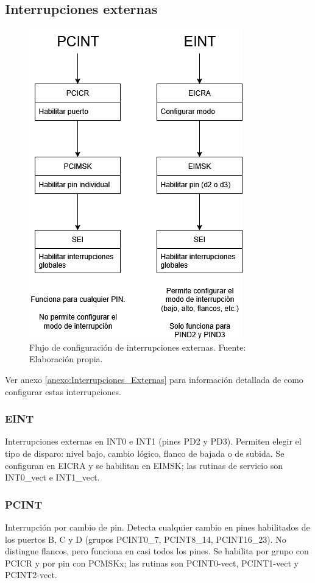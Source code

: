\subsection{Interrupciones externas}

    \begin{figure}[H]
    \centering
    \includegraphics[width=0.7\linewidth]{./Anexos/Marco Teorico/External Interrupts/Interrupt diagram.png}
    \caption{Flujo de configuración de interrupciones externas. Fuente: Elaboración propia.}
    \label{fig:InterruptDiagram}
    \end{figure}

    Ver anexo \ref{anexo:Interrupciones_Externas} para información detallada de como configurar estas interrupciones.

    \subsubsection{EINT}
    Interrupciones externas en INT0 e INT1 (pines PD2 y PD3). Permiten elegir el tipo de disparo: nivel bajo, cambio lógico, flanco de bajada o de subida. Se configuran en EICRA y se habilitan en EIMSK; las rutinas de servicio son INT0\_vect e INT1\_vect.

    \subsubsection{PCINT}
    Interrupción por cambio de pin. Detecta cualquier cambio en pines habilitados de los puertos B, C y D (grupos PCINT0\_7, PCINT8\_14, PCINT16\_23). No distingue flancos, pero funciona en casi todos los pines. Se habilita por grupo con PCICR y por pin con PCMSKx; las rutinas son PCINT0-vect, PCINT1-vect y PCINT2-vect.


